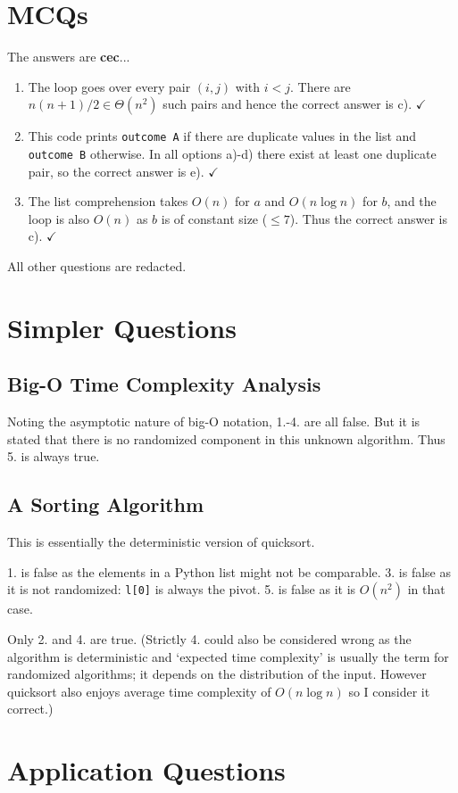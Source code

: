 \documentclass[12pt]{article}
\renewcommand{\t}{\texttt}
\begin{document}
\section{MCQs}
The answers are \textbf{cec}...
\begin{enumerate}
\item The loop goes over every pair $(i,j)$ with $i<j$. There are $n(n+1)/2\in\Theta\left(n^2\right)$ such pairs and hence the correct answer is c). $\checkmark$
\item This code prints \t{outcome A} if there are duplicate values in the list and \t{outcome B} otherwise. In all options a)-d) there exist at least one duplicate pair, so the correct answer is e). $\checkmark$
\item The list comprehension takes $O(n)$ for $a$ and $O(n\log n)$ for $b$, and the loop is also $O(n)$ as $b$ is of constant size ($\le7$). Thus the correct answer is c). $\checkmark$
\end{enumerate}
All other questions are redacted.
\section{Simpler Questions}
\subsection{Big-O Time Complexity Analysis}
Noting the asymptotic nature of big-O notation, 1.-4. are all false. But it is stated that there is no randomized component in this unknown algorithm. Thus 5. is always true.
\subsection{A Sorting Algorithm}
This is essentially the deterministic version of quicksort.

1. is false as the elements in a Python list might not be comparable. 3. is false as it is not randomized: \t{l[0]} is always the pivot. 5. is false as it is $O\left(n^2\right)$ in that case.

Only 2. and 4. are true. (Strictly 4. could also be considered wrong as the algorithm is deterministic and `expected time complexity' is usually the term for randomized algorithms; it depends on the distribution of the input. However quicksort also enjoys average time complexity of $O(n\log n)$ so I consider it correct.)
\section{Application Questions}
\end{document}

